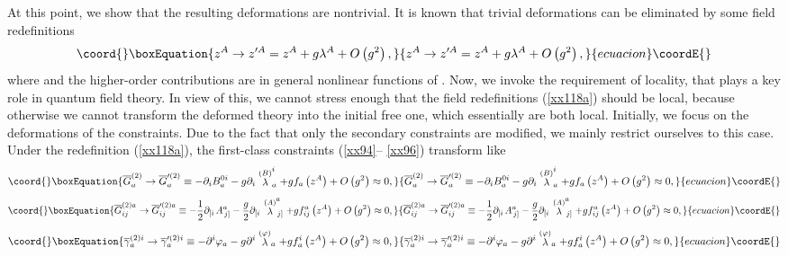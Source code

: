 \documentclass[a4paper,12pt]{article}
\begin{document}
At this point, we show that the resulting deformations are nontrivial. It is
known that trivial deformations can be eliminated by some field
redefinitions 
\begin{equation}\coord{}\boxEquation{
z^{A}\rightarrow z^{\prime A}=z^{A}+g\lambda ^{A}+O\left( g^{2}\right) ,
\label{xx118a}
}{
z^{A}\rightarrow z^{\prime A}=z^{A}+g\lambda ^{A}+O\left( g^{2}\right) ,
}{ecuacion}\coordE{}\end{equation}
where \coordHE{} and the higher-order contributions are in general
nonlinear functions of \coordHE{}. Now, we invoke the requirement of locality,
that plays a key role in quantum field theory. In view of this, we cannot
stress enough that the field redefinitions (\ref{xx118a}) should be local,
because otherwise we cannot transform the deformed theory into the initial
free one, which essentially are both local. Initially, we focus on the
deformations of the constraints. Due to the fact that only the secondary
constraints are modified, we mainly restrict ourselves to this case. Under
the redefinition (\ref{xx118a}), the first-class constraints (\ref{xx94}--%
\ref{xx96}) transform like
\begin{equation}\coord{}\boxEquation{
\overline{G}_{a}^{(2)}\rightarrow \overline{G}_{a}^{\prime (2)}\equiv
-\partial _{i}B_{a}^{0i}-g\partial _{i}\stackrel{(B)}{\lambda }
_{a}^{i}+gf_{a}\left( z^{A}\right) +O\left( g^{2}\right) \approx 0,
\label{xx118b}
}{
\overline{G}_{a}^{(2)}\rightarrow \overline{G}_{a}^{\prime (2)}\equiv
-\partial _{i}B_{a}^{0i}-g\partial _{i}\stackrel{(B)}{\lambda }
_{a}^{i}+gf_{a}\left( z^{A}\right) +O\left( g^{2}\right) \approx 0,
}{ecuacion}\coordE{}\end{equation}
\begin{equation}\coord{}\boxEquation{
\overline{G}_{ij}^{(2)a}\rightarrow \overline{G}_{ij}^{\prime (2)a}\equiv -
\frac{1}{2}\partial _{\left[ i\right. }A_{\left. j\right] }^{a}-\frac{g}{2}
\partial _{\left[ i\right. }\stackrel{(A)}{\lambda }_{\left. j\right]
}^{a}+gf_{ij}^{a}\left( z^{A}\right) +O\left( g^{2}\right) \approx 0,
\label{xx118c}
}{
\overline{G}_{ij}^{(2)a}\rightarrow \overline{G}_{ij}^{\prime (2)a}\equiv -
\frac{1}{2}\partial _{\left[ i\right. }A_{\left. j\right] }^{a}-\frac{g}{2}
\partial _{\left[ i\right. }\stackrel{(A)}{\lambda }_{\left. j\right]
}^{a}+gf_{ij}^{a}\left( z^{A}\right) +O\left( g^{2}\right) \approx 0,
}{ecuacion}\coordE{}\end{equation}
\begin{equation}\coord{}\boxEquation{
\overline{\gamma }_{a}^{(2)i}\rightarrow \overline{\gamma }_{a}^{\prime
(2)i}\equiv -\partial ^{i}\varphi _{a}-g\partial ^{i}\stackrel{(\varphi )}{
\lambda }_{a}+gf_{a}^{i}\left( z^{A}\right) +O\left( g^{2}\right) \approx 0,
\label{xx118d}
}{
\overline{\gamma }_{a}^{(2)i}\rightarrow \overline{\gamma }_{a}^{\prime
(2)i}\equiv -\partial ^{i}\varphi _{a}-g\partial ^{i}\stackrel{(\varphi )}{
\lambda }_{a}+gf_{a}^{i}\left( z^{A}\right) +O\left( g^{2}\right) \approx 0,
}{ecuacion}\coordE{}\end{equation}
\end{document}
